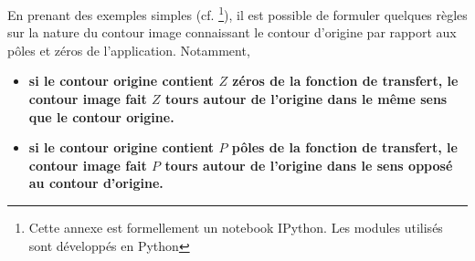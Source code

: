 En prenant des exemples simples (cf. \footnote{Cette 
annexe est formellement un notebook IPython. Les modules utilisés sont 
développés en Python}), il est possible de formuler quelques règles sur la 
nature du contour image connaissant le contour d'origine par rapport aux
pôles et zéros de l'application. Notamment,
\begin{itemize}
    \item \textbf{si le contour origine contient $Z$ zéros de la fonction de 
          transfert, le contour image fait $Z$ tours autour de l'origine dans 
          le même sens que le contour origine.}
    \item \textbf{si le contour origine contient $P$ pôles de la fonction de 
          transfert, le contour image fait $P$ tours autour de l'origine dans 
          le sens opposé au contour d'origine.}
\end{itemize}
\clearpage

\captionsetup{width=0.9\linewidth}
